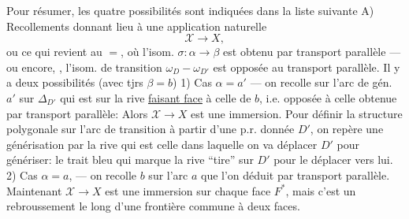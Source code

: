Pour résumer, les quatre possibilités sont indiquées dans la liste suivante
A) Recollements donnant lieu à une application naturelle
\[\mathcal X\longrightarrow X,\]
ou ce qui revient au $=$, où l'isom. $\sigma:\alpha\longrightarrow\beta$  est obtenu par transport parallèle --- ou encore, ,  l'isom. de transition $\omega_D\mathbin{-}\omega_{D'}$ est opposée au transport parallèle. Il y a deux possibilités (avec tjrs $\beta=b$)
1) Cas $\alpha=a'$ --- on recolle    sur l'arc  de gén. $a'$ sur $\Delta_{D'}$ qui est sur la rive \uline{faisant face} à celle de $b$, i.e. opposée à celle obtenue par transport parallèle:  Alors $\mathcal X\longrightarrow X$ est une immersion. 
\margin{\unsure{*}}
Pour définir la structure polygonale sur l'arc de transition à partir d'une p.r. donnée $D'$, on repère  une générisation par la rive qui est  celle dans laquelle on va déplacer $D'$ pour génériser: le trait bleu qui marque la rive ``tire'' sur $D'$ pour le déplacer vers lui.
2) Cas $\alpha=a$, --- on recolle $b$ sur l'arc $a$ que l'on déduit par transport parallèle. Maintenant $\mathcal X\longrightarrow X$ est une immersion sur chaque face $F^*$, mais c'est un rebroussement le long d'une frontière commune à deux faces.

